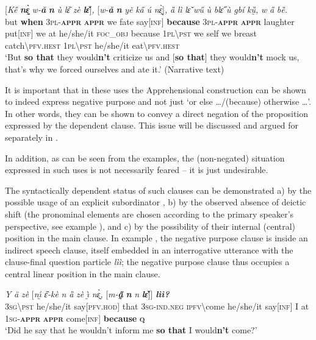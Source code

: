 \documentclass[output=paper,colorlinks,citecolor=brown
]{langscibook}
\begin{document}
\ea \label{ex:Fed58}
\gll \textup{[}\textit{Ke̋} \textit{\textbf{nɛ̰̀}} \textit{w-\textbf{ǎ}} \textit{\textbf{n{\ù}}} \textit{ù} \textit{lɛ̏} \textit{zè} \textit{\textbf{lɛ̌}}\textup{]}\textit{,} \textup{[}\textit{w-\textbf{ǎ}} \textit{\textbf{n{\ù}}} \textit{yě} \textit{ka̋} \textit{ú} \textit{nɛ̰̀}\textup{]}\textit{,} \textit{ȁ} \textit{lì} \textit{lɛ̌} \textit{wű} \textit{ù} \textit{blɛ̋} \textit{ù} \textit{gbí} \textit{kṵ̏,} \textit{w} \textit{a̋} \textit{bȅ.} \\
but \textbf{when} \textsc{3pl-\textbf{appr}} \textsc{\textbf{appr}} we fate say[\textsc{inf}] \textbf{because} \textsc{3pl-\textbf{appr}} \textsc{\textbf{appr}} laughter put[\textsc{inf}] we at he/she/it \textsc{foc\_obj} because \textsc{1pl\backslash pst} we self we breast catch\backslash\textsc{pfv.hest} \textsc{1pl\backslash pst} he/she/it eat\backslash\textsc{pfv.hest} \\
\glt `But \textbf{so that} they would\textbf{n't} criticize us and [\textbf{so that}] they would\textbf{n't} mock us, that's why we forced ourselves and ate it.' (Narrative text)
\z


It is important that in these uses the Apprehensional construction can be shown to indeed express negative purpose and not just `or else {\dots}\slash (because) otherwise {\dots}'. In other words, they can be shown to convey a direct negation of the proposition expressed by the dependent clause. This issue will be discussed and argued for separately in .

In addition, as can be seen from the examples, the (non-negated) situation expressed in such uses is not necessarily feared -- it is just undesirable.

The syntactically dependent status of such clauses can be demonstrated a) by the possible usage of an explicit subordinator , b) by the observed absence of deictic shift (the pronominal elements are chosen according to the primary speaker's perspective, see example ), and c) by the possibility of their internal (central) position in the main clause. In example , the negative purpose clause is inside an indirect speech clause, itself embedded in an interrogative utterance with the clause-final question particle \textit{lìì}; the negative purpose clause thus occupies a central linear position in the main clause.

\ea \label{ex:Fed59}
\gll \textit{Y} \textit{ä} \textit{zè} \textup{[}\textit{nı̰́} \textit{ɛ̏-kè} \textit{n{\ù}} \textit{ȁ} \textit{zè} \textit{ı̰̀} \textit{nɛ̰̀,} \textup{[}\textit{m-\textbf{a̰̋}} \textit{\textbf{n{\ù}}} \textit{n{\ù}} \textit{\textbf{lɛ̌}}\textup{]]} \textit{\textbf{lìì?}} \\
\textsc{3sg\backslash pst} he/she/it say[\textsc{pfv.hod}] that \textsc{3sg-ind.neg} \textsc{ipfv\backslash}come he/she/it say[\textsc{inf}] I at \textsc{1sg-\textbf{appr}} \textsc{\textbf{appr}} come[\textsc{inf}] \textbf{because} \textsc{\textbf{q}} \\
\glt `Did he say that he wouldn't inform me \textbf{so that} I would\textbf{n't} come?'
\z
\end{document}

